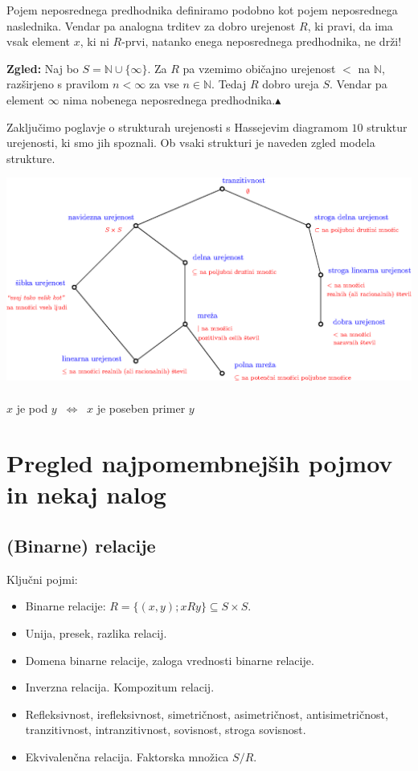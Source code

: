 \documentclass[11pt,paper=b5,footinclude,headinclude]{scrbook} %
\def\cee {{~\Leftrightarrow~}}
\def\zgled{\noindent\textbf{\color{blue} Zgled: }}
\def\kz{{\hfill{\color{blue}$\blacktriangle$}}}%
\begin{document}
\medskip
Pojem neposrednega predhodnika definiramo podobno kot pojem neposrednega naslednika.
Vendar pa analogna trditev za dobro urejenost $R$, ki pravi, da ima vsak element $x$, ki ni $R$-prvi, natanko enega neposrednega predhodnika, ne drži!

\bigskip
\zgled
Naj bo $S = \mathbb{N}\cup\{\infty\}$. Za $R$ pa vzemimo običajno urejenost $<$ na $\mathbb{N}$, razširjeno s pravilom $n<\infty$ za vse $n\in \mathbb{N}$. Tedaj $R$ dobro ureja $S$. Vendar pa element $\infty$ nima nobenega neposrednega predhodnika.\kz


Zaključimo poglavje o strukturah urejenosti s Hassejevim diagramom $10$ struktur urejenosti, ki smo jih spoznali.
Ob vsaki strukturi je naveden zgled modela strukture.

\begin{center}
\includegraphics[width=\linewidth]{strukture2.eps}
~~\\
$x$ je pod $y$ $\cee$ $x$ je poseben primer $y$
\end{center}

\section{Pregled najpomembnejših pojmov in nekaj nalog}


\subsection{(Binarne) relacije}

Ključni pojmi:
\begin{itemize}
  \item Binarne relacije:
  $R = \{(x,y) ; xRy \}\subseteq S\times S$.
  \item Unija, presek, razlika relacij.
  \item Domena binarne relacije, zaloga vrednosti binarne relacije.
  \item Inverzna relacija. Kompozitum relacij.
\item Refleksivnost, irefleksivnost, simetričnost, asimetričnost, antisimetričnost, tranzitivnost, intranzitivnost,
sovisnost, stroga sovisnost.
\item Ekvivalenčna relacija. Faktorska množica $S/R$.
\end{itemize}
\end{document}
